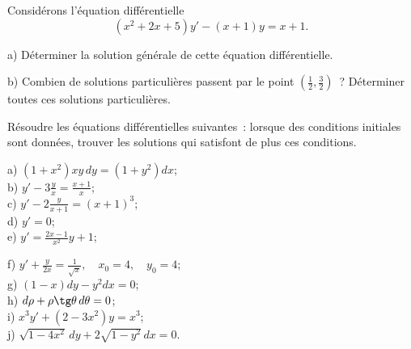 \documentclass[12pt,french,oneside,a4paper]{memoir} %
\begin{document}
\begin{exo}
Considérons l'équation différentielle
\begin{equation*}
(x^2+2x+5)y'-(x+1)y=x+1.
\end{equation*}

a) Déterminer la solution générale de cette équation
différentielle.

b) Combien de solutions particulières passent par le point
${(\frac{1}{2},\frac{3}{2})}$~? Déterminer toutes ces
solutions particulières.
\end{exo}

\begin{exo}
Résoudre les équations différentielles suivantes~:
lorsque des conditions initiales sont données, trouver les
solutions qui satisfont de plus ces conditions.\\[2mm]
\hfill\hspace*{6mm}
\begin{minipage}[t]{8cm}
a) $\displaystyle{(1+x^2)xy\,dy=(1+y^2)dx}$;\\[2mm]
b) $\displaystyle{y'-3\frac{y}{x}=\frac{x+1}{x}}$;\\[2mm]
c) $\displaystyle{y'-2\frac{y}{x+1}=(x+1)^3}$;\\[2mm]
d) $y'=0$;\\[2mm]
e) $\displaystyle{y'=\frac{2x-1}{x^2}y+1}$;
\end{minipage}
\hfill
\begin{minipage}[t]{8cm}
f) $\displaystyle{y'+\frac{y}{2x}=\frac{1}{\sqrt x},\quad
x_0=4,\quad y_0=4}$;\\[2mm]
g) $\displaystyle{(1-x)dy-y^2dx=0}$;\\[2mm]
h) $\displaystyle{d\rho+\rho\tg\theta\,d\theta=0}$;\\[2mm]
i) $\displaystyle{x^3y'+(2-3x^2)y=x^3}$;\\[2mm]
j) $\displaystyle{ \sqrt{1-4x^2}\,dy+2\sqrt{1-y^2}\,dx=0}$.
\end{minipage} \hfill
\end{exo}
\end{document}

